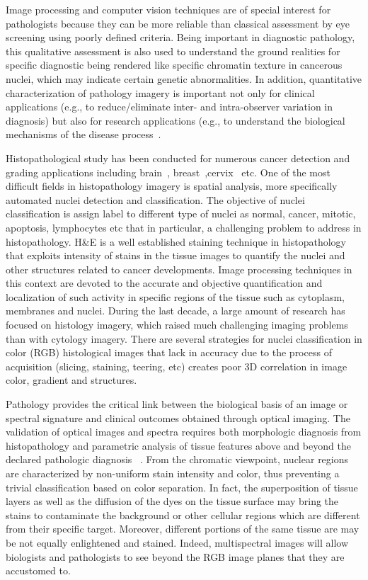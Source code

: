 \documentclass[10pt,twocolumn,letterpaper]{article}
\begin{document}
Image processing and computer vision techniques are of special interest for pathologists because they can be more reliable than classical assessment by eye screening using poorly defined criteria. Being important in diagnostic pathology, this qualitative assessment is also used to understand the ground realities for specific diagnostic being rendered like specific chromatin texture in cancerous nuclei, which may indicate certain genetic abnormalities. In addition, quantitative characterization of pathology imagery is important not only for clinical applications (e.g., to reduce/eliminate inter- and intra-observer variation in diagnosis) but also for research applications (e.g., to understand the biological mechanisms of the disease process~\cite{gurcan2009}. 

Histopathological study has been conducted for numerous cancer detection and grading applications including brain~\cite{ alkadi2010, sertel2009}, breast~\cite{ petushi2006,dundar2011,basavanhally2012},cervix~\cite{ Keenan2000} etc. One of the most difficult fields in histopathology imagery is spatial analysis, more specifically automated nuclei detection and classification. The objective of nuclei classification is assign label to different type of nuclei as normal, cancer, mitotic, apoptosis, lymphocytes etc that in particular, a challenging problem to address in histopathology. H\&E is a well established staining technique in histopathology that exploits intensity of stains in the tissue images to quantify the nuclei and other structures related to cancer developments. Image processing techniques in this context are devoted to the accurate and objective quantification and localization of such activity in specific regions of the tissue such as cytoplasm, membranes and nuclei. During the last decade, a large amount of research has focused on histology imagery, which raised much challenging imaging problems than with cytology imagery. There are several strategies for nuclei classification in color (RGB) histological images that lack in accuracy due to the process of acquisition (slicing, staining, teering, etc) creates poor 3D correlation in image color, gradient and structures.

Pathology provides the critical link between the biological basis of an image or spectral signature and clinical outcomes obtained through optical imaging. The validation of optical images and spectra requires both morphologic diagnosis from histopathology and parametric analysis of tissue features above and beyond the declared pathologic diagnosis ~\cite{wells2007}. From the chromatic viewpoint, nuclear regions are characterized by non-uniform stain intensity and color, thus preventing a trivial classification based on color separation. In fact, the superposition of tissue layers as well as the diffusion of the dyes on the tissue surface may bring the stains to contaminate the background or other cellular regions which are different from their specific target. Moreover, different portions of the same tissue are may be not equally enlightened and stained. Indeed, multispectral images will allow biologists and pathologists to see beyond the RGB image planes that they are accustomed to. 
\end{document}
